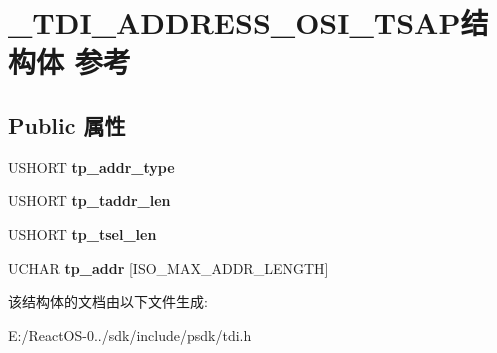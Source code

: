 \hypertarget{struct___t_d_i___a_d_d_r_e_s_s___o_s_i___t_s_a_p}{}\section{\+\_\+\+T\+D\+I\+\_\+\+A\+D\+D\+R\+E\+S\+S\+\_\+\+O\+S\+I\+\_\+\+T\+S\+A\+P结构体 参考}
\label{struct___t_d_i___a_d_d_r_e_s_s___o_s_i___t_s_a_p}
\subsection*{Public 属性}
\begin{DoxyCompactItemize}
\item 
\mbox{\label{struct___t_d_i___a_d_d_r_e_s_s___o_s_i___t_s_a_p_a334aa7f0d3e0a4377a70c623834497ab}} 
U\+S\+H\+O\+RT {\bfseries tp\+\_\+addr\+\_\+type}
\item 
\mbox{\label{struct___t_d_i___a_d_d_r_e_s_s___o_s_i___t_s_a_p_a34faae70f152e8be511328e6ea86fcaa}} 
U\+S\+H\+O\+RT {\bfseries tp\+\_\+taddr\+\_\+len}
\item 
\mbox{\label{struct___t_d_i___a_d_d_r_e_s_s___o_s_i___t_s_a_p_a9dd00cc1a98c36aedd4b54486a65f99e}} 
U\+S\+H\+O\+RT {\bfseries tp\+\_\+tsel\+\_\+len}
\item 
\mbox{\label{struct___t_d_i___a_d_d_r_e_s_s___o_s_i___t_s_a_p_a670bcd40899b4e639b7279ddf9ce9232}} 
U\+C\+H\+AR {\bfseries tp\+\_\+addr} \mbox{[}I\+S\+O\+\_\+\+M\+A\+X\+\_\+\+A\+D\+D\+R\+\_\+\+L\+E\+N\+G\+TH\mbox{]}
\end{DoxyCompactItemize}


该结构体的文档由以下文件生成\+:\begin{DoxyCompactItemize}
\item 
E\+:/\+React\+O\+S-\/0../sdk/include/psdk/tdi.\+h\end{DoxyCompactItemize}
